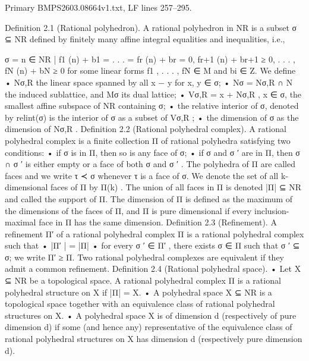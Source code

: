 \documentclass[
  11pt,
]{article}
\newenvironment{Shaded}{}{}
\newcommand{\NormalTok}[1]{#1}
\begin{document}
Primary BMPS2603.08664v1.txt, LF lines 257--295.

\begin{Shaded}
\begin{Highlighting}[]
\NormalTok{Definition 2.1 (Rational polyhedron). A rational polyhedron in NR is a subset σ ⊆ NR defined}
\NormalTok{by finitely many affine integral equalities and inequalities, i.e.,}
                           
\NormalTok{                      σ = n ∈ NR | f1 (n) + b1 = . . . = fr (n) + br = 0,}
\NormalTok{                                      fr+1 (n) + br+1 ≥ 0, . . . , fN (n) + bN ≥ 0}
\NormalTok{for some linear forms f1 , . . . , fN ∈ M and bi ∈ Z.}
\NormalTok{    We define}
\NormalTok{      • Nσ,R the linear space spanned by all x − y for x, y ∈ σ;}
\NormalTok{      • Nσ = Nσ,R ∩ N the induced sublattice, and Mσ its dual lattice;}
\NormalTok{      • Vσ,R = x + Nσ,R , x ∈ σ, the smallest affine subspace of NR containing σ;}
\NormalTok{      • the relative interior of σ, denoted by relint(σ) is the interior of σ as a subset of Vσ,R ;}
\NormalTok{      • the dimension of σ as the dimension of Nσ,R .}
\NormalTok{Definition 2.2 (Rational polyhedral complex). A rational polyhedral complex is a finite}
\NormalTok{collection Π of rational polyhedra satisfying two conditions:}
\NormalTok{      • if σ is in Π, then so is any face of σ;}
\NormalTok{      • if σ and σ ′ are in Π, then σ ∩ σ ′ is either empty or a face of both σ and σ ′ .}
\NormalTok{   The polyhedra of Π are called faces and we write τ ≺ σ whenever τ is a face of σ. We denote}
\NormalTok{the set of all k{-}dimensional faces of Π by Π(k) . The union of all faces in Π is denoted |Π| ⊆ NR}
\NormalTok{and called the support of Π.}
\NormalTok{  The dimension of Π is defined as the maximum of the dimensions of the faces of Π, and Π is}
\NormalTok{pure dimensional if every inclusion{-}maximal face in Π has the same dimension.}
\NormalTok{Definition 2.3 (Refinement). A refinement Π′ of a rational polyhedral complex Π is a rational}
\NormalTok{polyhedral complex such that}
\NormalTok{      • |Π′ | = |Π|}
\NormalTok{      • for every σ ′ ∈ Π′ , there exists σ ∈ Π such that σ ′ ⊆ σ;}
\NormalTok{we write Π′ ≥ Π. Two rational polyhedral complexes are equivalent if they admit a common}
\NormalTok{refinement.}
\NormalTok{Definition 2.4 (Rational polyhedral space).}
\NormalTok{      • Let X ⊆ NR be a topological space. A rational polyhedral complex Π is a rational polyhedral}
\NormalTok{        structure on X if |Π| = X.}
\NormalTok{      • A polyhedral space X ⊆ NR is a topological space together with an equivalence class of}
\NormalTok{        rational polyhedral structures on X.}
\NormalTok{      • A polyhedral space X is of dimension d (respectively of pure dimension d) if some (and}
\NormalTok{        hence any) representative of the equivalence class of rational polyhedral structures on X has}
\NormalTok{        dimension d (respectively pure dimension d).}


\end{Highlighting}
\end{Shaded}
\end{document}
